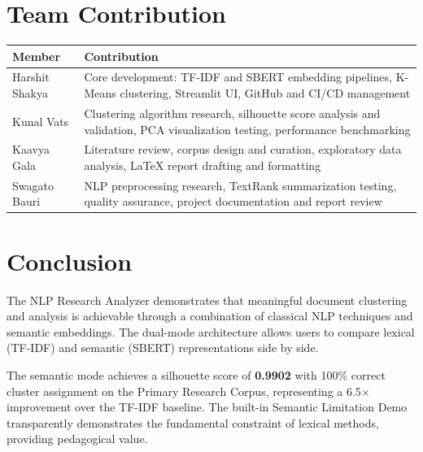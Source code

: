 \documentclass[12pt, a4paper]{article}
\begin{document}
\section{Team Contribution}


\begin{table}[H]
\centering
\begin{tabular}{@{}lp{9cm}@{}}
\toprule
\textbf{Member} & \textbf{Contribution} \\
\midrule
Harshit Shakya & Core development: TF-IDF and SBERT embedding pipelines, K-Means clustering, Streamlit UI, GitHub and CI/CD management \\
Kunal Vats & Clustering algorithm research, silhouette score analysis and validation, PCA visualization testing, performance benchmarking \\
Kaavya Gala & Literature review, corpus design and curation, exploratory data analysis, LaTeX report drafting and formatting \\
Swagato Bauri & NLP preprocessing research, TextRank summarization testing, quality assurance, project documentation and report review \\
\bottomrule
\end{tabular}
\end{table}

\section{Conclusion}

The NLP Research Analyzer demonstrates that meaningful document clustering and analysis is achievable through a combination of classical NLP techniques and semantic embeddings. The dual-mode architecture allows users to compare lexical (TF-IDF) and semantic (SBERT) representations side by side.

The semantic mode achieves a silhouette score of \textbf{0.9902} with 100\% correct cluster assignment on the Primary Research Corpus, representing a 6.5$\times$ improvement over the TF-IDF baseline. The built-in Semantic Limitation Demo transparently demonstrates the fundamental constraint of lexical methods, providing pedagogical value.
\end{document}
